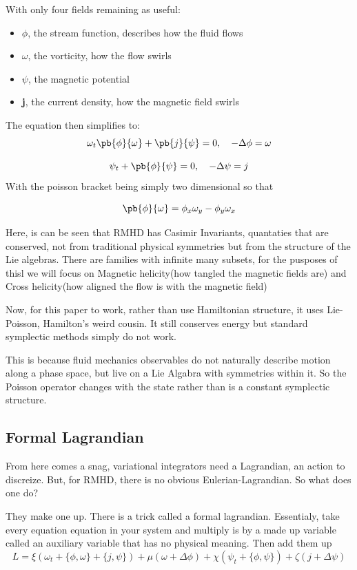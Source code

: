 With only four fields remaining as useful:
\begin{itemize}
  \item $\phi$, the stream function, describes how the fluid flows
  \item $\omega$, the vorticity, how the flow swirls
  \item $\psi$, the magnetic potential
  \item \textbf{j}, the current density, how the magnetic field swirls
\end{itemize}

The equation then simplifies to:
\[
  \omega_t \pb{\phi}{\omega} + \pb{j}{\psi} = 0, \quad - \Delta \phi = \omega
\]

\[
\psi_t + \pb{\phi}{\psi}= 0, \quad - \Delta \psi = j
  \]
  With the poisson bracket being simply two dimensional so that

\[
\pb{\phi}{\omega} = \phi_x \omega_y - \phi_y \omega_x
  \]

  Here, is can be seen that RMHD has Casimir Invariants, quantaties that are conserved, not from traditional physical symmetries but from the structure of the Lie algebras. There are families with infinite many subsets, for the pusposes of thisl we will focus on Magnetic helicity(how tangled the magnetic fields are) and Cross helicity(how aligned the flow is with the magnetic field)


  Now, for this paper to work, rather than use Hamiltonian structure, it uses Lie-Poisson, Hamilton's weird cousin. It still conserves energy but standard symplectic methods simply do not work.

  This is because fluid mechanics observables do not naturally describe motion along a phase space, but live on a Lie Algabra with symmetries within it. So the Poisson operator changes with the state rather than is a constant symplectic structure.

\subsection{Formal Lagrandian}

From here comes a snag, variational integrators need a Lagrandian, an action to discreize. But, for RMHD, there is no obvious Eulerian-Lagrandian. So what does one do?

They make one up. There is a trick called a formal lagrandian. Essentialy, take every equation equation in your system and multiply is by a made up variable called an auxiliary variable that has no physical meaning. Then add them up
\[
L = \xi\left(\omega_t + \{\phi,\omega\} + \{j,\psi\}\right)
    + \mu\left(\omega + \Delta\phi\right)
    + \chi\left(\psi_t + \{\phi,\psi\}\right)
    + \zeta\left(j + \Delta\psi\right)
 \]


